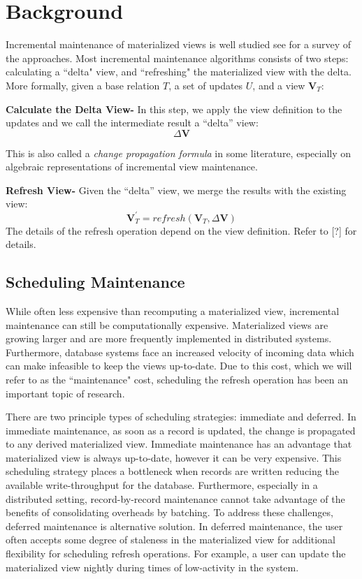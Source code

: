 \section{Background}
Incremental maintenance of materialized views is well studied see \cite{chirkova2011materialized} for a survey of the approaches. 
Most incremental maintenance algorithms consists of two steps: calculating a ``delta" view,
and ``refreshing" the materialized view with the delta.
More formally, given a base relation $T$, a set of updates $U$,
and a view $\textbf{V}_{T}$:

\textbf{Calculate the Delta View- }
In this step, we apply the view definition to the updates and we call
the intermediate result a ``delta'' view:
\[
\Delta\textbf{V}
\]

This is also called a \emph{change propagation formula} in some literature,
especially on algebraic representations of incremental view maintenance.

\textbf{Refresh View- }
Given the ``delta'' view, we merge the results with the existing
view:
\[
\textbf{V}_{T}^{'}=refresh(\textbf{V}_{T},\Delta\textbf{V})
\] 
The details of the refresh operation depend on the view definition.
Refer to [?] for details.


\subsection{Scheduling Maintenance}
While often less expensive than recomputing a materialized view,
incremental maintenance can still be computationally expensive.
Materialized views are growing larger and are more frequently 
implemented in distributed systems.
Furthermore, database systems face an increased velocity of incoming data which
can make infeasible to keep the views up-to-date.
Due to this cost, which we will refer to as the ``maintenance" cost, 
scheduling the refresh operation has been an important topic of research.

There are two principle types of scheduling strategies: immediate and deferred. 
In immediate maintenance, as soon as a record is updated, 
the change is propagated to any derived materialized view.
Immediate maintenance has an advantage that materialized view is always up-to-date, 
however it can be very expensive.
This scheduling strategy places a bottleneck when records are written reducing 
the available write-throughput for the database.
Furthermore, especially in a distributed setting, record-by-record 
maintenance cannot take advantage of the benefits of consolidating overheads by batching.
To address these challenges, deferred maintenance is alternative solution.
In deferred maintenance, the user often accepts some degree of staleness in 
the materialized view for additional flexibility for scheduling refresh operations.
For example, a user can update the materialized view 
nightly during times of low-activity in the system.

